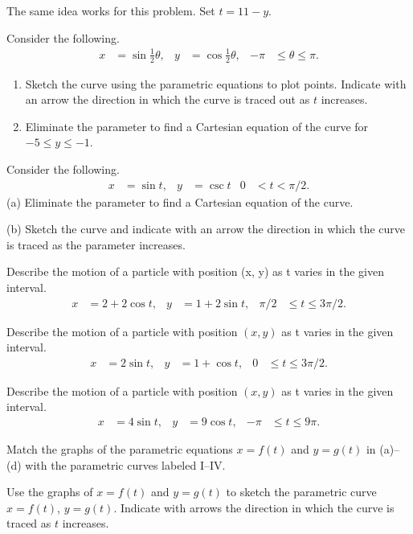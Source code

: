 \begin{problem}[Solution]
The same idea works for this problem. Set $t=11-y$.
\end{problem}
\begin{problem}[WebAssign HW 31, \# 4]
Consider the following.
\[
  \begin{aligned}
    x&=\sin\tfrac{1}{2}\theta,
    &y&=\cos\tfrac{1}{2}\theta,
    &-\pi&\leq\theta\leq\pi.
  \end{aligned}
\]
\begin{enumerate}[label=(\alph*)]
\item Sketch the curve using the parametric equations to plot
  points. Indicate with an arrow the direction in which the curve is traced
  out as $t$ increases.
\item Eliminate the parameter to find a Cartesian equation of the curve for
  $-5\leq y\leq -1$.
\end{enumerate}
\end{problem}

\begin{problem}[WebAssign HW 31, \# 5]
Consider the following.
\[
  \begin{aligned}
    x&=\sin t,&
    y&=\csc t&
    0&<t<\pi/2.
  \end{aligned}
\]
(a) Eliminate the parameter to find a Cartesian equation of the curve.

(b) Sketch the curve and indicate with an arrow the direction in which the
curve is traced as the parameter increases.
\end{problem}
\begin{problem}[WebAssign HW 31, \# 6]
Describe the motion of a particle with position (x, y) as t varies in the
given interval.
\[
  \begin{aligned}
    x&=2+2\cos t,&
    y&=1+2\sin t,&
    \pi/2&\leq t\leq 3\pi/2.
  \end{aligned}
\]
\end{problem}
\begin{problem}[WebAssign HW 31, \# 7]
Describe the motion of a particle with position $(x,y)$ as t varies in the
given interval.
\[
  \begin{aligned}
    x&=2\sin t,&
    y&=1+\cos t,&
    0&\leq t \leq 3\pi/2.
  \end{aligned}
\]
\end{problem}
\begin{problem}[WebAssign HW 31, \# 8]
Describe the motion of a particle with position $(x,y)$ as t varies in the
given interval.
\[
  \begin{aligned}
    x&=4\sin t,&
    y&=9\cos t,&
    -\pi&\leq t\leq 9\pi.
  \end{aligned}
\]
\end{problem}
\begin{problem}[WebAssign HW 31, \# 9]
 Match the graphs of the parametric equations $x=f(t)$ and $y=g(t)$ in
 (a)--(d) with the parametric curves labeled I--IV.
\end{problem}
\begin{problem}[WebAssign HW 31, \# 10]
 Use the graphs of $x=f(t)$ and $y=g(t)$ to sketch the parametric curve
 $x=f(t)$, $y=g(t)$.  Indicate with arrows the direction in which the curve
 is traced as $t$ increases.
\end{problem}
